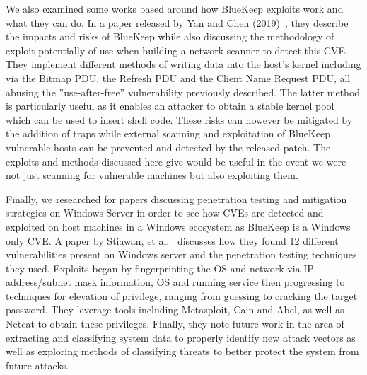 We also examined some works based around how BlueKeep exploits work and what they can do. In a paper released by Yan and Chen (2019)~\cite{yan_chen_2019}, they describe the impacts and risks of BlueKeep while also discussing the methodology of exploit potentially of use when building a network scanner to detect this CVE. They implement different methods of writing data into the host's kernel including via the Bitmap PDU, the Refresh PDU and the Client Name Request PDU, all abusing the ''use-after-free'' vulnerability previously described. The latter method is particularly useful as it enables an attacker to obtain a stable kernel pool which can be used to insert shell code. These risks can however be mitigated by the addition of traps while external scanning and exploitation of BlueKeep vulnerable hosts can be prevented and detected by the released patch. The exploits and methods discussed here give would be useful in the event we were not just scanning for vulnerable machines but also exploiting them.

Finally, we researched for papers discussing penetration testing and mitigation strategies on Windows Server in order to see how CVEs are detected and exploited on host machines in a Windows ecosystem as BlueKeep is a Windows only CVE. A paper by Stiawan, et al.~\cite{penetration_2016} discusses how they found 12 different vulnerabilities present on Windows server and the penetration testing techniques they used. Exploits began by fingerprinting the OS and network via IP address/subnet mask information, OS and running service then progressing to techniques for elevation of privilege, ranging from guessing to cracking the target password. They leverage tools including Metasploit, Cain and Abel, as well as Netcat to obtain these privileges. Finally, they note future work in the area of extracting and classifying system data to properly identify new attack vectors as well as exploring methods of classifying threats to better protect the system from future attacks.